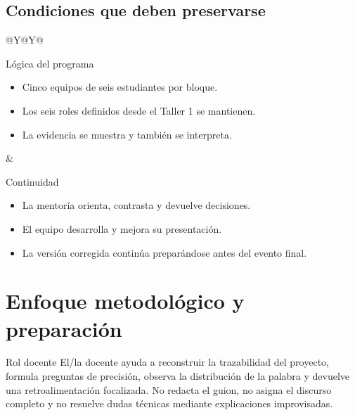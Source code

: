 \documentclass[10pt,a4paper]{article}
\begin{document}
\subsection{Condiciones que deben preservarse}
\begin{tabularx}{\textwidth}{@{}Y@{\hspace{4mm}}Y@{}}
\begin{docbox}[height=46mm]{Lógica del programa}
\begin{itemize}
  \item Cinco equipos de seis estudiantes por bloque.
  \item Los seis roles definidos desde el Taller 1 se mantienen.
  \item La evidencia se muestra y también se interpreta.
\end{itemize}
\end{docbox}
&
\begin{docbox}[height=46mm]{Continuidad}
\begin{itemize}
  \item La mentoría orienta, contrasta y devuelve decisiones.
  \item El equipo desarrolla y mejora su presentación.
  \item La versión corregida continúa preparándose antes del evento final.
\end{itemize}
\end{docbox}
\end{tabularx}

\newpage
\section{Enfoque metodológico y preparación}

\begin{navybox}{Rol docente}
El/la docente ayuda a reconstruir la trazabilidad del proyecto, formula preguntas de precisión, observa la distribución de la palabra y devuelve una retroalimentación focalizada. No redacta el guion, no asigna el discurso completo y no resuelve dudas técnicas mediante explicaciones improvisadas.
\end{navybox}
\end{document}
